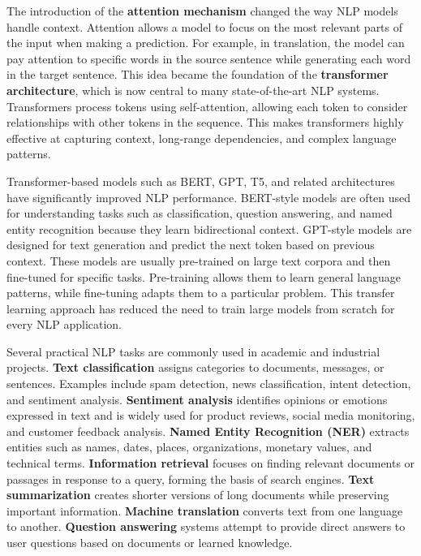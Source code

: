 \documentclass[11pt]{article}
\begin{document}
The introduction of the \textbf{attention mechanism} changed the way NLP models handle context. Attention allows a model to focus on the most relevant parts of the input when making a prediction. For example, in translation, the model can pay attention to specific words in the source sentence while generating each word in the target sentence. This idea became the foundation of the \textbf{transformer architecture}, which is now central to many state-of-the-art NLP systems. Transformers process tokens using self-attention, allowing each token to consider relationships with other tokens in the sequence. This makes transformers highly effective at capturing context, long-range dependencies, and complex language patterns.

Transformer-based models such as BERT, GPT, T5, and related architectures have significantly improved NLP performance. BERT-style models are often used for understanding tasks such as classification, question answering, and named entity recognition because they learn bidirectional context. GPT-style models are designed for text generation and predict the next token based on previous context. These models are usually pre-trained on large text corpora and then fine-tuned for specific tasks. Pre-training allows them to learn general language patterns, while fine-tuning adapts them to a particular problem. This transfer learning approach has reduced the need to train large models from scratch for every NLP application.

Several practical NLP tasks are commonly used in academic and industrial projects. \textbf{Text classification} assigns categories to documents, messages, or sentences. Examples include spam detection, news classification, intent detection, and sentiment analysis. \textbf{Sentiment analysis} identifies opinions or emotions expressed in text and is widely used for product reviews, social media monitoring, and customer feedback analysis. \textbf{Named Entity Recognition (NER)} extracts entities such as names, dates, places, organizations, monetary values, and technical terms. \textbf{Information retrieval} focuses on finding relevant documents or passages in response to a query, forming the basis of search engines. \textbf{Text summarization} creates shorter versions of long documents while preserving important information. \textbf{Machine translation} converts text from one language to another. \textbf{Question answering} systems attempt to provide direct answers to user questions based on documents or learned knowledge.
\end{document}
